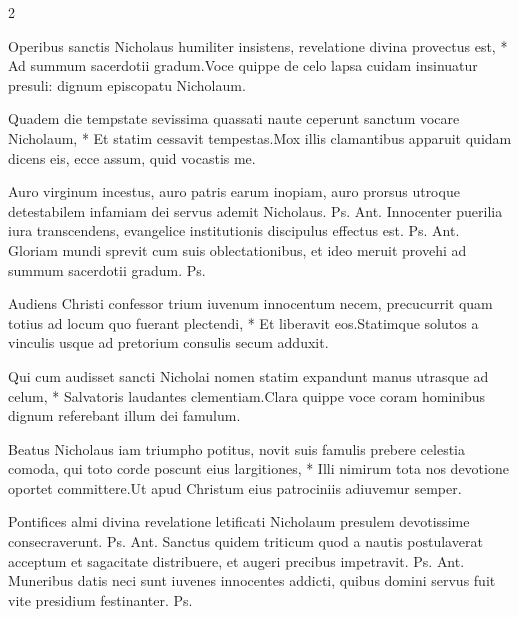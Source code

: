 \begin{multicols*}{2}
\begin{responsory}
{Operibus sanctis Nicholaus humiliter insistens, revelatione divina provectus est, * Ad summum sacerdotii gradum.}{Voce quippe de celo lapsa cuidam insinuatur
presuli: dignum episcopatu Nicholaum.}
\end{responsory}%
\begin{responsory-doxology}
{Quadem die tempstate sevissima quassati naute ceperunt sanctum vocare Nicholaum, * Et statim cessavit tempestas.}{Mox illis clamantibus apparuit quidam dicens eis, ecce assum, quid vocastis me.}
\end{responsory-doxology}%
 Auro virginum incestus, auro patris earum inopiam, auro prorsus utroque detestabilem infamiam dei servus ademit Nicholaus. {\color{Red} Ps.}  {\color{Red} Ant.} Innocenter puerilia iura transcendens, evangelice institutionis discipulus effectus est. {\color{Red} Ps.}  {\color{Red} Ant.} Gloriam mundi sprevit cum suis oblectationibus, et ideo meruit provehi ad summum sacerdotii gradum. {\color{Red} Ps.} 
\begin{responsory}
{Audiens Christi confessor trium iuvenum innocentum necem, precucurrit quam totius ad locum quo fuerant plectendi, * Et liberavit eos.}{Statimque solutos a vinculis usque ad pretorium consulis secum adduxit.}
\end{responsory}%
\begin{responsory}
{Qui cum audisset sancti Nicholai nomen statim expandunt manus utrasque ad celum, * Salvatoris laudantes clementiam.}{Clara quippe voce coram hominibus dignum referebant illum dei famulum.}
\end{responsory}%
\begin{responsory-doxology}
{Beatus Nicholaus iam triumpho potitus, novit suis famulis prebere celestia comoda, qui toto corde poscunt eius largitiones, * Illi nimirum tota nos devotione oportet committere.}{Ut apud Christum eius patrociniis adiuvemur semper.}
\end{responsory-doxology}%
 Pontifices almi divina revelatione letificati Nicholaum presulem devotissime consecraverunt. {\color{Red} Ps.}  {\color{Red} Ant.} Sanctus quidem triticum quod a nautis postulaverat acceptum et sagacitate distribuere, et augeri precibus impetravit. {\color{Red} Ps.}  {\color{Red} Ant.} Muneribus datis neci sunt iuvenes innocentes addicti, quibus domini servus fuit vite presidium festinanter. {\color{Red} Ps.} 

\end{multicols*}
